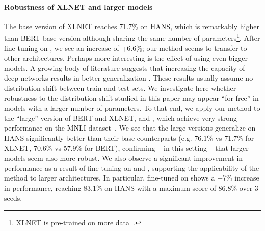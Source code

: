 \paragraph{Robustness of XLNET and larger models}
The base version of XLNET reaches 71.7\% on HANS, which is remarkably higher than BERT base version although sharing the same number of parameters\footnote{XLNET is pre-trained on more data~\citep{yang2019xlnet}.}. After fine-tuning on \flstm, we see an increase of +6.6\%; our method seems to transfer to other architectures. Perhaps more interesting is the effect of using even bigger models. A growing body of literature suggests that increasing the capacity of deep networks results in better generalization \cite{belkin2018reconciling,deepdouble}. These results usually assume no distribution shift between train and test sets. We investigate here whether robustness to the distribution shift studied in this paper may appear ``for free'' in models with a larger number of parameters. To that end, we apply our method to the ``large'' version of BERT and XLNET, \bertlarge and \xlnetlarge, which 
achieve very strong performance on the MNLI dataset~\cite{devlin2018bert,yang2019xlnet}. We see that the large versions generalize on HANS significantly better than their base counterparts (e.g. 76.1\% vs 71.7\% for XLNET, 70.6\% vs 57.9\% for BERT), confirming -- in this setting -- that larger models seem also more robust. We also observe a significant improvement in performance as a result of fine-tuning on \fbert and \fbow, supporting the applicability of the method to larger architectures. In particular, \xlnetlarge fine-tuned on \fbow shows a +7\% increase in performance, reaching 83.1\% on HANS with a maximum score of 86.8\% over 3 seeds.

